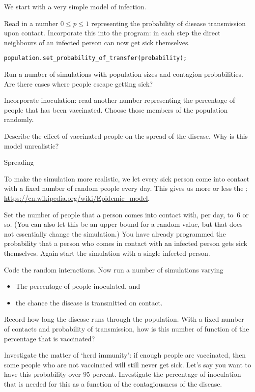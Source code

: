 We start with a very simple model of infection.

\begin{exercise}
  \label{ex:infect:1}
  Read in a number $0\leq p \leq 1$ representing the probability of
  disease transmission upon contact. Incorporate this into the
  program: in each step the direct neighbours of an infected person
  can now get sick themselves.
\begin{verbatim}
population.set_probability_of_transfer(probability);  
\end{verbatim}
  Run a number of simulations with population sizes and contagion
  probabilities. Are there cases where people escape getting sick?
\end{exercise}

\begin{exercise}
  \label{ex:infect:2}
  Incorporate inoculation: read another number representing the
  percentage of people that has been vaccinated. Choose those members
  of the population randomly.

  Describe the effect of vaccinated people on the spread of the
  disease. Why is this model unrealistic?
\end{exercise}

 {Spreading}

To make the simulation more realistic, we let every sick person come
into contact with a fixed number of random people every day. This
gives us more or less the ;
\url{https://en.wikipedia.org/wiki/Epidemic_model}.

Set the number of people that a person comes into contact with, per
day, to~6 or so. (You can also let this be an upper bound for a random
value, but that
does not essentially change the simulation.) You have already programmed the probability that a
person who comes in contact with an infected person gets sick themselves.
Again start the simulation with a single infected person.

\begin{exercise}
  \label{ex:infect:3}
  Code the random interactions. Now run a number of simulations varying
  \begin{itemize}
  \item The percentage of people inoculated, and
  \item the chance the disease is transmitted on contact.
  \end{itemize}
  Record how long the disease runs through the population. With a
  fixed number of contacts and probability of transmission, how is
  this number of function of the percentage that is vaccinated?

  Investigate the matter of `herd immunity': if enough people are
  vaccinated, then some people who are not vaccinated will still never get
  sick. Let's say you want to have this probability over 95
  percent. Investigate the percentage of inoculation that is needed
  for this as a function of the contagiousness of the disease.
\end{exercise}

